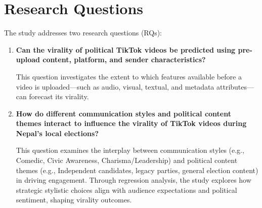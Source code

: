\documentclass[12pt,a4paper]{report}
\begin{document}
\chapter{Research Questions}
\label{sec:research_questions}

The study addresses two research questions (RQs):

\begin{enumerate}[label=RQ\arabic*:, leftmargin=*]
    \item \textbf{Can the virality of political TikTok videos be predicted using pre-upload content, platform, and sender characteristics?}
    
    This question investigates the extent to which features available before a video is uploaded—such as audio, visual, textual, and metadata attributes—can forecast its virality. 

    \item \textbf{How do different communication styles and political content themes interact to influence the virality of TikTok videos during Nepal’s local elections?}
    
    This question examines the interplay between communication styles (e.g., Comedic, Civic Awareness, Charisma/Leadership) and political content themes (e.g., Independent candidates, legacy parties, general election content) in driving engagement. Through regression analysis, the study explores how strategic stylistic choices align with audience expectations and political sentiment, shaping virality outcomes. 
\end{enumerate}
\end{document}
